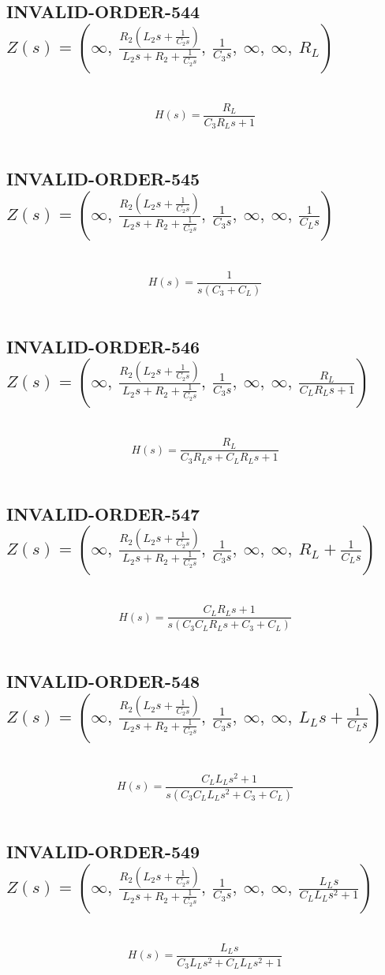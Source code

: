 \documentclass{article}
\begin{document}
\subsection{INVALID-ORDER-544 $Z(s) = \left( \infty, \  \frac{R_{2} \left(L_{2} s + \frac{1}{C_{2} s}\right)}{L_{2} s + R_{2} + \frac{1}{C_{2} s}}, \  \frac{1}{C_{3} s}, \  \infty, \  \infty, \  R_{L}\right)$ } \ 
\textbf{\[H(s) = \frac{R_{L}}{C_{3} R_{L} s + 1}\] } \ 
\subsection{INVALID-ORDER-545 $Z(s) = \left( \infty, \  \frac{R_{2} \left(L_{2} s + \frac{1}{C_{2} s}\right)}{L_{2} s + R_{2} + \frac{1}{C_{2} s}}, \  \frac{1}{C_{3} s}, \  \infty, \  \infty, \  \frac{1}{C_{L} s}\right)$ } \ 
\textbf{\[H(s) = \frac{1}{s \left(C_{3} + C_{L}\right)}\] } \ 
\subsection{INVALID-ORDER-546 $Z(s) = \left( \infty, \  \frac{R_{2} \left(L_{2} s + \frac{1}{C_{2} s}\right)}{L_{2} s + R_{2} + \frac{1}{C_{2} s}}, \  \frac{1}{C_{3} s}, \  \infty, \  \infty, \  \frac{R_{L}}{C_{L} R_{L} s + 1}\right)$ } \ 
\textbf{\[H(s) = \frac{R_{L}}{C_{3} R_{L} s + C_{L} R_{L} s + 1}\] } \ 
\subsection{INVALID-ORDER-547 $Z(s) = \left( \infty, \  \frac{R_{2} \left(L_{2} s + \frac{1}{C_{2} s}\right)}{L_{2} s + R_{2} + \frac{1}{C_{2} s}}, \  \frac{1}{C_{3} s}, \  \infty, \  \infty, \  R_{L} + \frac{1}{C_{L} s}\right)$ } \ 
\textbf{\[H(s) = \frac{C_{L} R_{L} s + 1}{s \left(C_{3} C_{L} R_{L} s + C_{3} + C_{L}\right)}\] } \ 
\subsection{INVALID-ORDER-548 $Z(s) = \left( \infty, \  \frac{R_{2} \left(L_{2} s + \frac{1}{C_{2} s}\right)}{L_{2} s + R_{2} + \frac{1}{C_{2} s}}, \  \frac{1}{C_{3} s}, \  \infty, \  \infty, \  L_{L} s + \frac{1}{C_{L} s}\right)$ } \ 
\textbf{\[H(s) = \frac{C_{L} L_{L} s^{2} + 1}{s \left(C_{3} C_{L} L_{L} s^{2} + C_{3} + C_{L}\right)}\] } \ 
\subsection{INVALID-ORDER-549 $Z(s) = \left( \infty, \  \frac{R_{2} \left(L_{2} s + \frac{1}{C_{2} s}\right)}{L_{2} s + R_{2} + \frac{1}{C_{2} s}}, \  \frac{1}{C_{3} s}, \  \infty, \  \infty, \  \frac{L_{L} s}{C_{L} L_{L} s^{2} + 1}\right)$ } \ 
\textbf{\[H(s) = \frac{L_{L} s}{C_{3} L_{L} s^{2} + C_{L} L_{L} s^{2} + 1}\] } \ 
\end{document}

